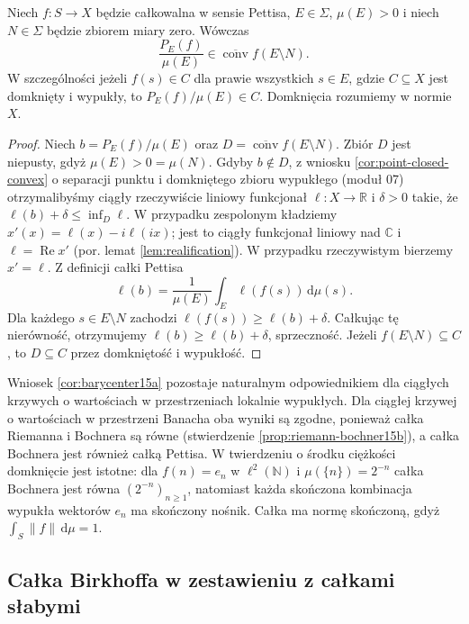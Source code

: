 \begin{twierdzenie}
\label{thm:pettis-barycenter15b}
Niech $f:S\to X$ będzie całkowalna w sensie Pettisa,
$E\in\Sigma$, $\mu(E)>0$ i niech $N\in\Sigma$ będzie
zbiorem miary zero. Wówczas
\[
 \frac{P_E(f)}{\mu(E)}
 \in\overline{\operatorname{conv}} f(E\setminus N).
\]
W szczególności jeżeli $f(s)\in C$ dla prawie
wszystkich $s\in E$, gdzie $C\subseteq X$ jest
domknięty i wypukły, to $P_E(f)/\mu(E)\in C$.
Domknięcia rozumiemy w normie $X$.
\end{twierdzenie}
\begin{proof}
Niech $b=P_E(f)/\mu(E)$ oraz
$D=\overline{\operatorname{conv}}f(E\setminus N)$.
Zbiór $D$ jest niepusty, gdyż $\mu(E)>0=\mu(N)$.
Gdyby $b\notin D$, z wniosku
\ref{cor:point-closed-convex} o separacji punktu
i domkniętego zbioru wypukłego (moduł 07)
otrzymalibyśmy ciągły rzeczywiście liniowy
funkcjonał $\ell:X\to\mathbb R$ i $\delta>0$
takie, że $\ell(b)+\delta\le\inf_D\ell$.
W przypadku zespolonym kładziemy
$x'(x)=\ell(x)-i\ell(ix)$; jest to ciągły
funkcjonał liniowy nad $\mathbb C$ i $\ell=\operatorname{Re}x'$
(por. lemat \ref{lem:realification}).
W przypadku rzeczywistym bierzemy $x'=\ell$.
Z definicji całki Pettisa
\[
 \ell(b)=\frac{1}{\mu(E)}
              \int_E\ell(f(s))\,\mathrm d\mu(s).
\]
Dla każdego $s\in E\setminus N$ zachodzi
$\ell(f(s))\ge\ell(b)+\delta$.
Całkując tę nierówność, otrzymujemy
$\ell(b)\ge\ell(b)+\delta$, sprzeczność.
Jeżeli $f(E\setminus N)\subseteq C$, to
$D\subseteq C$ przez domkniętość i wypukłość.
\end{proof}

Wniosek \ref{cor:barycenter15a} pozostaje naturalnym
odpowiednikiem dla ciągłych krzywych o wartościach
w przestrzeniach lokalnie wypukłych. Dla ciągłej
krzywej o wartościach w przestrzeni Banacha oba wyniki
są zgodne, ponieważ całka Riemanna i Bochnera
są równe (stwierdzenie \ref{prop:riemann-bochner15b}),
a całka Bochnera jest również całką Pettisa.
W twierdzeniu o środku ciężkości domknięcie jest
istotne: dla $f(n)=e_n$ w $\ell^2(\mathbb N)$
i $\mu(\{n\})=2^{-n}$ całka Bochnera
jest równa $(2^{-n})_{n\ge1}$, natomiast
każda skończona kombinacja wypukła wektorów $e_n$
ma skończony nośnik. Całka ma normę skończoną,
gdyż $\int_S\|f\|\,\mathrm d\mu=1$.

\subsection{Całka Birkhoffa w zestawieniu z całkami słabymi}

